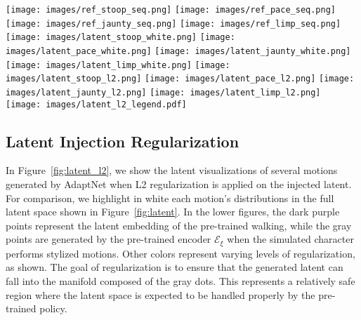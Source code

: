 \begin{figure*}[t]
    \centering
    \texttt{[image: images/ref\_stoop\_seq.png]}
    \quad
    \texttt{[image: images/ref\_pace\_seq.png]}
    \quad
    \texttt{[image: images/ref\_jaunty\_seq.png]}
    \quad
    \texttt{[image: images/ref\_limp\_seq.png]}
    \texttt{[image: images/latent\_stoop\_white.png]}
    \quad
    \texttt{[image: images/latent\_pace\_white.png]}
    \quad
    \texttt{[image: images/latent\_jaunty\_white.png]}
    \quad
    \texttt{[image: images/latent\_limp\_white.png]}
    \texttt{[image: images/latent\_stoop\_l2.png]}
    \quad
    \texttt{[image: images/latent\_pace\_l2.png]}
    \quad
    \texttt{[image: images/latent\_jaunty\_l2.png]}
    \quad
    \texttt{[image: images/latent\_limp\_l2.png]}
    \\\vspace{0.2cm}
    \texttt{[image: images/latent\_l2\_legend.pdf]}



    

    \vspace{-8pt}
    \caption{Latent space distributions of \textit{Stoop},  \textit{Pace}, \textit{Jaunty Walk},  \textit{Limp} (left to right). 
    The top figures show the distribution of the stylized motions in the full latent space without regularization, and
    the bottom figures show the distribution with regularization applied during adaptation training.
    Gray points shown in the bottom figures are the latent embeddings generated by the pre-trained encoder $\mathcal{E}_\xi$ while the character performs the stylized motions.
    $\beta$ is the regularization coefficient from Eq.~\ref{eq:loss_adapt}.
    }
    \label{fig:latent_l2}
\end{figure*}

\subsection{Latent Injection Regularization}
In Figure~\ref{fig:latent_l2}, 
we show the latent visualizations of several motions %
generated by AdaptNet when L2 regularization is applied on the injected latent.  
For comparison, we highlight in white each motion's distributions %
in the full latent space shown in Figure~\ref{fig:latent}.
In the lower figures,
the dark purple points represent the latent embedding of the pre-trained walking, while %
the gray points are generated by the pre-trained encoder $\mathcal{E}_\xi$ when the simulated character performs stylized motions. %
Other colors represent varying levels of regularization, as shown.
The goal of regularization is to ensure that the generated latent can fall into the manifold composed of the gray dots. 
This represents a relatively safe region 
where the latent space is expected to be handled properly by %
the pre-trained policy.

